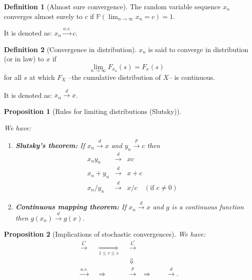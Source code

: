 \documentclass[
  11pt,
]{book}
\newtheorem{proposition}{Proposition}[chapter]
\theoremstyle{definition}
\newtheorem{definition}{Definition}[chapter]
\theoremstyle{definition}
\theoremstyle{definition}
\theoremstyle{definition}
\theoremstyle{remark}
\begin{document}
\begin{definition}[Almost sure convergence]
\protect\hypertarget{def:convergenceAlmost}{}\label{def:convergenceAlmost}The random variable sequence \(x_n\) converges almost surely to \(c\) if \(\mathbb{P}(\lim_{n \rightarrow \infty} x_n = c) = 1\).

It is denoted as: \(x_n \overset{a.s.}{\rightarrow} c\).
\end{definition}

\begin{definition}[Convergence in distribution]
\protect\hypertarget{def:cvgceDistri}{}\label{def:cvgceDistri}\(x_n\) is said to converge in distribution (or in law) to \(x\) if
\[
\lim_{n \rightarrow \infty} F_{x_n}(s) = F_{x}(s)
\]
for all \(s\) at which \(F_X\) --the cumulative distribution of \(X\)-- is continuous.

It is denoted as: \(x_n \overset{d}{\rightarrow} x\).
\end{definition}

\begin{proposition}[Rules for limiting distributions (Slutsky)]
\protect\hypertarget{prp:Slutsky}{}\label{prp:Slutsky}

We have:

\begin{enumerate}
\def\labelenumi{\roman{enumi}.}
\item
  \textbf{Slutsky's theorem:} If \(x_n \overset{d}{\rightarrow} x\) and \(y_n \overset{p}{\rightarrow} c\) then
  \begin{eqnarray*}
  x_n y_n &\overset{d}{\rightarrow}& x c \\
  x_n + y_n &\overset{d}{\rightarrow}& x + c \\
  x_n/y_n &\overset{d}{\rightarrow}& x / c \quad (\mbox{if }c \ne 0)
  \end{eqnarray*}
\item
  \textbf{Continuous mapping theorem:} If \(x_n \overset{d}{\rightarrow} x\) and \(g\) is a continuous function then \(g(x_n) \overset{d}{\rightarrow} g(x).\)
\end{enumerate}

\end{proposition}

\begin{proposition}[Implications of stochastic convergences]
\protect\hypertarget{prp:implicationsconv}{}\label{prp:implicationsconv}We have:
\begin{align*}
&\boxed{\overset{L^s}{\rightarrow}}& &\underset{1 \le r \le s}{\Rightarrow}& &\boxed{\overset{L^r}{\rightarrow}}&\\
&& && &\Downarrow&\\
&\boxed{\overset{a.s.}{\rightarrow}}& &\Rightarrow& &\boxed{\overset{p}{\rightarrow}}& \Rightarrow \qquad \boxed{\overset{d}{\rightarrow}}.
\end{align*}
\end{proposition}
\end{document}
